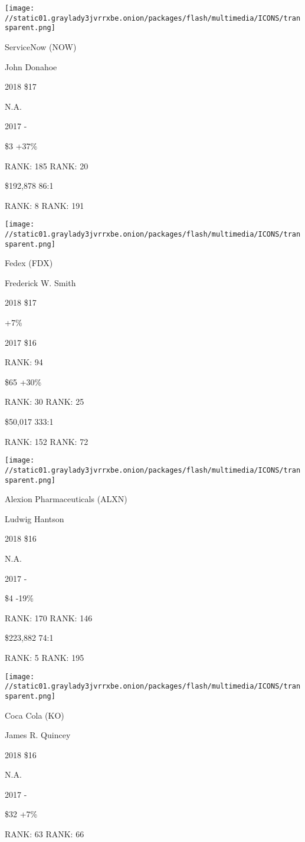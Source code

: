 \texttt{[image: //static01.graylady3jvrrxbe.onion/packages/flash/multimedia/ICONS/transparent.png]}

ServiceNow (NOW)

John Donahoe \protect\hyperlink{g-footnotes}{}

2018 \$17

 N.A.

2017 -

 \$3 +37\%

RANK: 185 RANK: 20

 \$192,878 86:1

RANK: 8 RANK: 191

\texttt{[image: //static01.graylady3jvrrxbe.onion/packages/flash/multimedia/ICONS/transparent.png]}

Fedex (FDX)

Frederick W. Smith \protect\hyperlink{g-footnotes}{}

2018 \$17

 +7\%

2017 \$16

RANK: 94

 \$65 +30\%

RANK: 30 RANK: 25

 \$50,017 333:1

RANK: 152 RANK: 72

\texttt{[image: //static01.graylady3jvrrxbe.onion/packages/flash/multimedia/ICONS/transparent.png]}

Alexion Pharmaceuticals (ALXN)

Ludwig Hantson \protect\hyperlink{g-footnotes}{}

2018 \$16

 N.A.

2017 -

 \$4 -19\%

RANK: 170 RANK: 146

 \$223,882 74:1

RANK: 5 RANK: 195

\texttt{[image: //static01.graylady3jvrrxbe.onion/packages/flash/multimedia/ICONS/transparent.png]}

Coca Cola (KO)

James R. Quincey \protect\hyperlink{g-footnotes}{}

2018 \$16

 N.A.

2017 -

 \$32 +7\%

RANK: 63 RANK: 66

